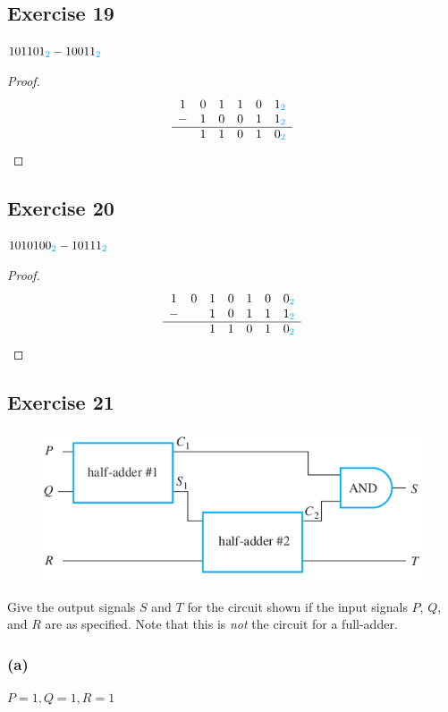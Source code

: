 \documentclass[14pt]{extarticle}
\newcommand{\base}[1]{{\color{cyan}#1}}
\begin{document}
\subsection{Exercise 19}
$101101_\base{2} - 10011_\base{2}$

\begin{proof}
$$
\begin{array}{cccccc}
1&0&1&1&0&1_\base{2}\\
-&1&0&0&1&1_\base{2}\\
\hline
&1&1&0&1&0_\base{2}\\
\end{array}
$$
\end{proof}

\subsection{Exercise 20}
$1010100_\base{2} - 10111_\base{2}$

\begin{proof}
$$
\begin{array}{ccccccc}
1&0&1&0&1&0&0_\base{2}\\
-&&1&0&1&1&1_\base{2}\\
\hline
& &1&1&0&1&0_\base{2}\\
\end{array}
$$
\end{proof}

\subsection{Exercise 21}
\begin{figure}[ht!]
\centering
\includegraphics[scale=0.4]{../images/2.5.21.png}
\end{figure}

Give the output signals $S$ and $T$ for the circuit shown if the input signals $P$, $Q$, and $R$ are as specified. Note that this is {\it not} the circuit for a full-adder.

\subsubsection{(a)}
$P = 1, Q = 1, R = 1$
\end{document}
